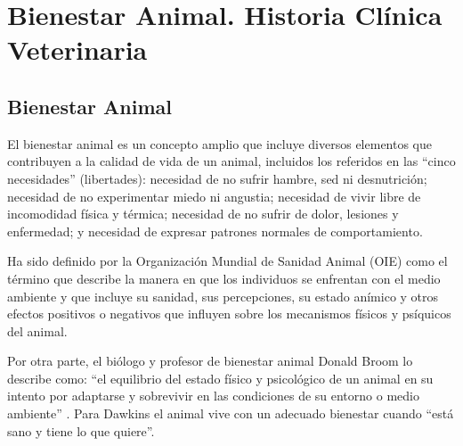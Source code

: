 \chapter{Bienestar Animal. Historia Clínica Veterinaria}\label{chapter:animalHealth}

\section{Bienestar Animal}
El bienestar animal es un concepto amplio que incluye diversos elementos que contribuyen a la calidad de vida de un animal, incluidos los referidos en las “cinco necesidades” (libertades): necesidad de no sufrir hambre, sed ni desnutrición; necesidad de no
experimentar miedo ni angustia; necesidad de vivir libre de incomodidad física y térmica; necesidad de no sufrir de dolor, lesiones y enfermedad; y necesidad de expresar patrones normales de comportamiento.


Ha sido definido por la Organización Mundial de Sanidad Animal (OIE) como el término que describe la manera en que los individuos se enfrentan con el medio ambiente y que incluye su sanidad, sus percepciones, su estado anímico y otros efectos positivos o negativos que influyen sobre los mecanismos físicos y psíquicos del animal.


Por otra parte, el biólogo y profesor de bienestar animal Donald Broom lo describe como: “el equilibrio del estado físico y psicológico de un animal en su intento por adaptarse y sobrevivir en las condiciones de su entorno o medio ambiente” . Para Dawkins  el animal vive con un adecuado bienestar cuando “está sano y tiene lo que quiere”.


